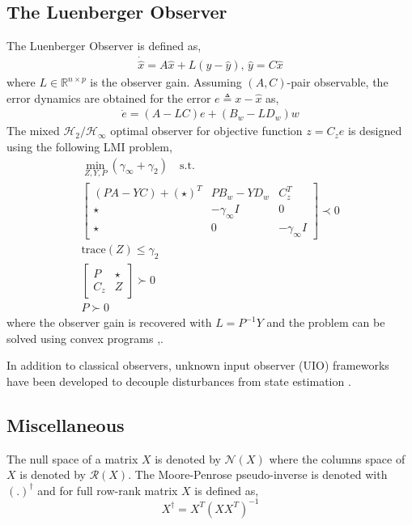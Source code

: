 \documentclass[pdflatex,sn-mathphys-num]{sn-jnl}%
\theoremstyle{thmstyleone}%
\theoremstyle{thmstyletwo}%
\theoremstyle{thmstylethree}%
\begin{document}
\subsection{The Luenberger Observer}
The Luenberger Observer is defined as,    
\begin{gather} 
    \dot{\hat{x}}=A \hat{x}+L(y-\hat{y}),\,\hat{y}=C \hat{x}
\end{gather}
where $L\in\mathbb{R}^{n\times p}$ is the observer gain. Assuming $(A,C)$-pair observable, the error dynamics are obtained for the error $e\triangleq x-\hat{x}$ as,
\begin{gather} 
    \dot{e}=(A-LC)e+(B_w-L D_w)w
\end{gather}
The mixed $\mathcal{H}_2/\mathcal{H}_\infty$ optimal observer for objective function $z=C_ze$ is designed using the following LMI problem\cite{duan2013lmis},
\begin{equation} \label{eqn:lmi1}
\begin{split} 
    \min_{Z,Y,P}{(\gamma_\infty+\gamma_2)}\quad \mathrm{s.t.}\\
    \begin{bmatrix}
        (PA-YC)+(\star)^T& PB_w-YD_w& C_z^T\\
        \star& -\gamma_\infty I& 0\\
        \star& 0& -\gamma_\infty I
    \end{bmatrix}\prec 0\\
    \mathrm{trace}(Z)\leq \gamma_2\\
    \begin{bmatrix}
       P& \star\\
       C_z& Z
    \end{bmatrix}\succ 0\\
    P\succ 0
\end{split} 
\end{equation}
where the observer gain is recovered with $L=P^{-1}Y$ and the problem can be solved using convex programs \cite{cvx},\cite{gb08}. 

In addition to classical observers, unknown input observer (UIO) frameworks have been developed to decouple disturbances from state estimation \cite{ChenPatton1999}.

\subsection{Miscellaneous}
The null space of a matrix $X$ is denoted by $\mathcal{N}(X)$ where the columns space of $X$ is denoted by $\mathcal{R}(X)$. 
The Moore-Penrose pseudo-inverse is denoted with $(.)^\dagger$ and for full row-rank matrix $X$ is defined as,
\begin{equation}
    X^\dagger=X^T(XX^T)^{-1}
\end{equation}
\end{document}
